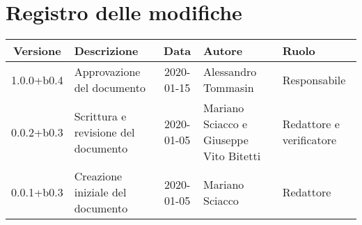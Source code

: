 \section*{Registro delle modifiche}

\begin{center}
	\begin{longtable}{|c|p{3.5cm}|c|p{3cm}|p{3cm}|}
	\hline
	\rowcolor{lighter-grayer}
	\textbf{Versione} & \textbf{Descrizione} & \textbf{Data} & \textbf{Autore} & \textbf{Ruolo} \\
	\hline
	\endfirsthead


	1.0.0+b0.4 & Approvazione del documento & 2020-01-15 & Alessandro Tommasin & Responsabile \\
	\hline
	0.0.2+b0.3 & Scrittura e revisione del documento & 2020-01-05 & Mariano Sciacco e Giuseppe Vito Bitetti & Redattore e verificatore \\
	\hline
	0.0.1+b0.3 & Creazione iniziale del documento & 2020-01-05 & Mariano Sciacco & Redattore \\
	\hline

	\end{longtable}
\end{center}